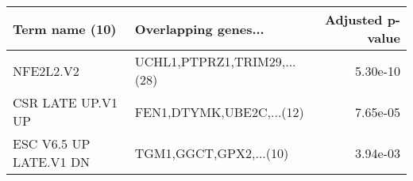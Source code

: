 \begin{tabular}{llr}
\toprule
        Term name (10) &        Overlapping genes... &  Adjusted p-value \\
\midrule
             NFE2L2.V2 & UCHL1,PTPRZ1,TRIM29,...(28) &          5.30e-10 \\
     CSR LATE UP.V1 UP &    FEN1,DTYMK,UBE2C,...(12) &          7.65e-05 \\
ESC V6.5 UP LATE.V1 DN &      TGM1,GGCT,GPX2,...(10) &          3.94e-03 \\
\bottomrule
\end{tabular}
